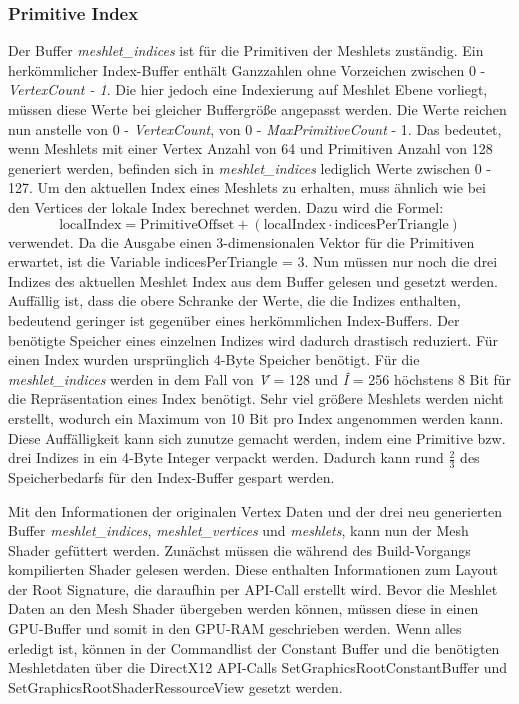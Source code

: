 \subsubsection*{Primitive Index}
Der Buffer \textit{meshlet\_indices} ist für die Primitiven der Meshlets zuständig.
Ein herkömmlicher Index-Buffer enthält Ganzzahlen ohne Vorzeichen zwischen 0 - \textit{VertexCount - 1}.
Die hier jedoch eine Indexierung auf Meshlet Ebene vorliegt, müssen diese Werte bei gleicher Buffergröße angepasst werden.
Die Werte reichen nun anstelle von 0 - \textit{VertexCount}, von 0 - \textit{MaxPrimitiveCount} - 1.
Das bedeutet, wenn Meshlets mit einer Vertex Anzahl von 64 und Primitiven Anzahl von 128 generiert werden, befinden sich in \textit{meshlet\_indices} lediglich Werte zwischen 0 - 127.
Um den aktuellen Index eines Meshlets zu erhalten, muss ähnlich wie bei den Vertices der lokale Index berechnet werden.
Dazu wird die Formel:
\begin{equation*}
\mathrm{localIndex} = \mathrm{PrimitiveOffset} + (\mathrm{localIndex} \cdot \mathrm{indicesPerTriangle})
\end{equation*}
verwendet.
Da die Ausgabe einen 3-dimensionalen Vektor für die Primitiven erwartet, ist die Variable indicesPerTriangle = 3.
Nun müssen nur noch die drei Indizes des aktuellen Meshlet Index aus dem Buffer gelesen und gesetzt werden.
\newline
Auffällig ist, dass die obere Schranke der Werte, die die Indizes enthalten, bedeutend geringer ist gegenüber eines herkömmlichen Index-Buffers.
Der benötigte Speicher eines einzelnen Indizes wird dadurch drastisch reduziert.
Für einen Index wurden ursprünglich 4-Byte Speicher benötigt.
Für die \textit{meshlet\_indices} werden in dem Fall von \textit{\^{V}} = 128 und \textit{\^{I}} = 256 höchstens 8 Bit für die Repräsentation eines Index benötigt.
Sehr viel größere Meshlets werden nicht erstellt, wodurch ein Maximum von 10 Bit pro Index angenommen werden kann.
Diese Auffälligkeit kann sich zunutze gemacht werden, indem eine Primitive bzw. drei Indizes in ein 4-Byte Integer verpackt werden.
Dadurch kann rund $\frac{2}{3}$ des Speicherbedarfs für den Index-Buffer gespart werden.

Mit den Informationen der originalen Vertex Daten und der drei neu generierten Buffer \textit{meshlet\_indices}, \textit{meshlet\_vertices} und \textit{meshlets}, kann nun der Mesh Shader gefüttert werden.
Zunächst müssen die während des Build-Vorgangs kompilierten Shader gelesen werden.
Diese enthalten Informationen zum Layout der Root Signature, die daraufhin per API-Call erstellt wird.
Bevor die Meshlet Daten an den Mesh Shader übergeben werden können, müssen diese in einen GPU-Buffer und somit in den GPU-RAM geschrieben werden.
Wenn alles erledigt ist, können in der Commandlist der Constant Buffer und die benötigten Meshletdaten über die DirectX12 API-Calls SetGraphicsRootConstantBuffer und SetGraphicsRootShaderRessourceView gesetzt werden.

